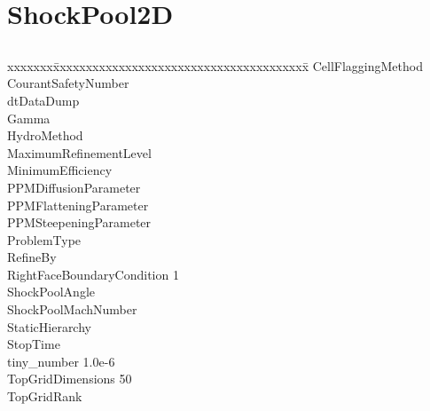 \documentclass{book}
\begin{document}
\subsection{\cello}

\section{ShockPool2D} \label{s:ShockPool2D}

\subsection{\enzo}

{\parametersize
\begin{tabbing}
xxxxxxx\=xxxxxxxxxxxxxxxxxxxxxxxxxxxxxxxxxxxxxxx\=\kill
\> CellFlaggingMethod         \\
\> CourantSafetyNumber     \\
\> dtDataDump              \\
\> Gamma                   \\
\> HydroMethod             \\
\> MaximumRefinementLevel     \\
\> MinimumEfficiency          \\
\> PPMDiffusionParameter          \\
\> PPMFlatteningParameter         \\
\> PPMSteepeningParameter         \\
\> ProblemType                     \\
\> RefineBy                       \\
\> RightFaceBoundaryCondition  1   \\
\> ShockPoolAngle               \\
\> ShockPoolMachNumber       \\
\> StaticHierarchy                \\
\> StopTime                \\
\> tiny\_number            \> 1.0e-6   \\
\> TopGridDimensions       50 \\
\> TopGridRank            
\end{tabbing}}
\end{document}
